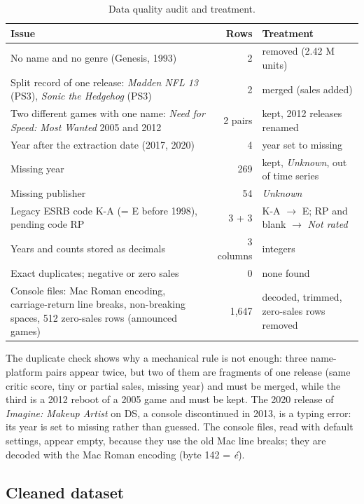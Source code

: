 \documentclass[12pt,a4paper]{article}
\begin{document}
\begin{table}[H]\centering\small
\caption{Data quality audit and treatment.}
\begin{tabularx}{\linewidth}{@{}Xrl@{}}
\toprule
Issue & Rows & Treatment\\\midrule
No name and no genre (Genesis, 1993) & 2 & removed (2.42 M units)\\
Split record of one release: \emph{Madden NFL 13} (PS3), \emph{Sonic the Hedgehog} (PS3) & 2 & merged (sales added)\\
Two different games with one name: \emph{Need for Speed: Most Wanted} 2005 and 2012 & 2 pairs & kept, 2012 releases renamed\\
Year after the extraction date (2017, 2020) & 4 & year set to missing\\
Missing year & 269 & kept, \emph{Unknown}, out of time series\\
Missing publisher & 54 & \emph{Unknown}\\
Legacy ESRB code K-A (= E before 1998), pending code RP & 3 + 3 & K-A $\to$ E; RP and blank $\to$ \emph{Not rated}\\
Years and counts stored as decimals & 3 columns & integers\\
Exact duplicates; negative or zero sales & 0 & none found\\
Console files: Mac Roman encoding, carriage-return line breaks, non-breaking spaces, 512 zero-sales rows (announced games) & 1{,}647 & decoded, trimmed, zero-sales rows removed\\
\bottomrule
\end{tabularx}
\end{table}

The duplicate check shows why a mechanical rule is not enough: three name-platform pairs
appear twice, but two of them are fragments of one release (same critic score, tiny or
partial sales, missing year) and must be merged, while the third is a 2012 reboot of a
2005 game and must be kept. The 2020 release of \emph{Imagine: Makeup Artist} on DS, a
console discontinued in 2013, is a typing error: its year is set to missing rather than
guessed. The console files, read with default settings, appear empty, because they use
the old Mac line breaks; they are decoded with the Mac Roman encoding (byte 142 =
\emph{é}).

\subsection{Cleaned dataset}
\end{document}
